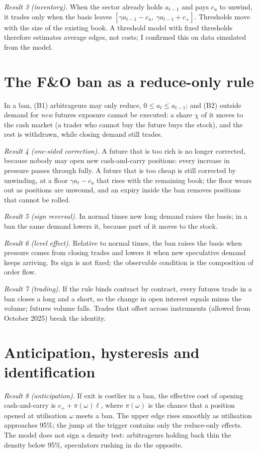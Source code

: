 \emph{Result 3 (inventory).} When the sector already holds $a_{t-1}$ and pays $c_u$ to unwind, it trades only when the basis
leaves $[\gamma a_{t-1}-c_u,\ \gamma a_{t-1}+c_+]$. Thresholds move with the size of the existing book. A threshold model with
fixed thresholds therefore estimates average edges, not costs; I confirmed this on data simulated from the model.

\section{The F\&O ban as a reduce-only rule}
In a ban, (B1) arbitrageurs may only reduce, $0\le a_t\le a_{t-1}$; and (B2) outside demand for \emph{new} futures exposure
cannot be executed: a share $\chi$ of it moves to the cash market (a trader who cannot buy the future buys the stock), and
the rest is withdrawn, while closing demand still trades.

\emph{Result 4 (one-sided correction).} A future that is too rich is no longer corrected, because nobody may open new
cash-and-carry positions: every increase in pressure passes through fully. A future that is too cheap is still corrected
by unwinding, at a floor $\gamma a_t-c_u$ that rises with the remaining book; the floor wears out as positions are
unwound, and an expiry inside the ban removes positions that cannot be rolled.


\emph{Result 5 (sign reversal).} In normal times new long demand raises the basis; in a ban the same demand lowers it,
because part of it moves to the stock.

\emph{Result 6 (level effect).} Relative to normal times, the ban raises the basis when pressure comes from closing trades
and lowers it when new speculative demand keeps arriving. Its sign is not fixed; the observable condition is the
composition of order flow.

\emph{Result 7 (trading).} If the rule binds contract by contract, every futures trade in a ban closes a long and a short,
so the change in open interest equals minus the volume; futures volume falls. Trades that offset across instruments
(allowed from October 2025) break the identity.

\section{Anticipation, hysteresis and identification}
\emph{Result 8 (anticipation).} If exit is costlier in a ban, the effective cost of opening cash-and-carry is
$c_++\pi(\omega)\ell$, where $\pi(\omega)$ is the chance that a position opened at utilisation $\omega$ meets a ban. The upper
edge rises smoothly as utilisation approaches 95\%; the jump at the trigger contains only the reduce-only effects. The model
does not sign a density test: arbitrageurs holding back thin the density below 95\%, speculators rushing in do the opposite.

